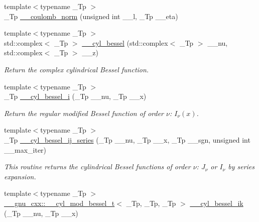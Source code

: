 \begin{DoxyCompactItemize}
\item 
{\footnotesize template$<$typename \+\_\+\+Tp $>$ }\\\+\_\+\+Tp \hyperlink{namespacestd_1_1____detail_a568c1e2b831de815e9ffb1b9c9fe1170}{\+\_\+\+\_\+coulomb\+\_\+norm} (unsigned int \+\_\+\+\_\+l, \+\_\+\+Tp \+\_\+\+\_\+eta)
\item 
{\footnotesize template$<$typename \+\_\+\+Tp $>$ }\\std\+::complex$<$ \+\_\+\+Tp $>$ \hyperlink{namespacestd_1_1____detail_ac4cff6a34fbd90932b47ecdb2445dee2}{\+\_\+\+\_\+cyl\+\_\+bessel} (std\+::complex$<$ \+\_\+\+Tp $>$ \+\_\+\+\_\+nu, std\+::complex$<$ \+\_\+\+Tp $>$ \+\_\+\+\_\+z)
\begin{DoxyCompactList}\small\item\em Return the complex cylindrical Bessel function. \end{DoxyCompactList}\item 
{\footnotesize template$<$typename \+\_\+\+Tp $>$ }\\\+\_\+\+Tp \hyperlink{namespacestd_1_1____detail_a72e3392d5c03c0bc8f2b5ffb8c1304b5}{\+\_\+\+\_\+cyl\+\_\+bessel\+\_\+i} (\+\_\+\+Tp \+\_\+\+\_\+nu, \+\_\+\+Tp \+\_\+\+\_\+x)
\begin{DoxyCompactList}\small\item\em Return the regular modified Bessel function of order $ \nu $\+: $ I_{\nu}(x) $. \end{DoxyCompactList}\item 
{\footnotesize template$<$typename \+\_\+\+Tp $>$ }\\\+\_\+\+Tp \hyperlink{namespacestd_1_1____detail_a8b52f1f93a90b9ed2504521e0ea440f5}{\+\_\+\+\_\+cyl\+\_\+bessel\+\_\+ij\+\_\+series} (\+\_\+\+Tp \+\_\+\+\_\+nu, \+\_\+\+Tp \+\_\+\+\_\+x, \+\_\+\+Tp \+\_\+\+\_\+sgn, unsigned int \+\_\+\+\_\+max\+\_\+iter)
\begin{DoxyCompactList}\small\item\em This routine returns the cylindrical Bessel functions of order $ \nu $\+: $ J_{\nu} $ or $ I_{\nu} $ by series expansion. \end{DoxyCompactList}\item 
{\footnotesize template$<$typename \+\_\+\+Tp $>$ }\\\hyperlink{struct____gnu__cxx_1_1____cyl__mod__bessel__t}{\+\_\+\+\_\+gnu\+\_\+cxx\+::\+\_\+\+\_\+cyl\+\_\+mod\+\_\+bessel\+\_\+t}$<$ \+\_\+\+Tp, \+\_\+\+Tp, \+\_\+\+Tp $>$ \hyperlink{namespacestd_1_1____detail_a9ada6640e605fc21b12191e651e39de1}{\+\_\+\+\_\+cyl\+\_\+bessel\+\_\+ik} (\+\_\+\+Tp \+\_\+\+\_\+nu, \+\_\+\+Tp \+\_\+\+\_\+x)

\end{DoxyCompactItemize}
